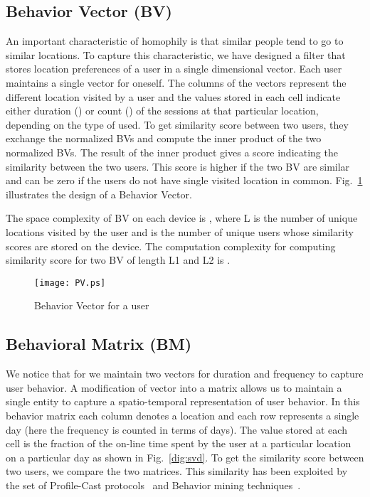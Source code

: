 \documentclass[10pt,conference]{IEEEtran}
\begin{document}
\subsection{Behavior Vector (BV)}
An important characteristic of homophily is that similar people tend to go to similar locations. To capture this characteristic, we have designed a filter that stores location preferences of a user in a single dimensional vector. Each user maintains a single vector for oneself. The columns of the vectors represent the different location visited by a user and the values stored in each cell indicate either duration () or count () of the sessions at that particular location, depending on the type of  used. To get similarity score between two users, they exchange the normalized BVs and compute the inner product of the two normalized BVs. The result of the inner product gives a score indicating the similarity between the two users. This score is higher if the two BV are  similar and can be zero if the users do not have single visited location in common. Fig.~\ref{dig:PV} illustrates the design of a Behavior Vector.

The space complexity of BV on each device is , where L is the number of unique locations visited by the user and  is the number of unique users whose similarity scores are stored on the device. The computation complexity for computing similarity score for two BV of length L1 and L2 is .



\begin{figure}
\centering
\texttt{[image: PV.ps]}

\caption{Behavior Vector for a user}
\label{dig:PV}
\end{figure}




\subsection{Behavioral Matrix (BM)} 


We notice that for  we maintain two vectors for duration and frequency to capture user behavior. A modification of vector into a matrix allows us to maintain a single entity to capture a spatio-temporal representation of user behavior. In this behavior matrix each column denotes a location and each row represents a single day (here the frequency is counted in terms of days). The value stored at each cell is the fraction of the on-line time spent by the user at a particular location on a particular day as shown in Fig.~\ref{dig:svd}. To get the similarity score between two users, we compare the two matrices. This similarity has been exploited by the set of Profile-Cast protocols~\cite{profilecast} and Behavior mining techniques~\cite{mineweijen}. 
\end{document}
